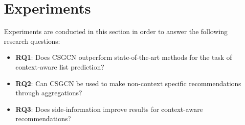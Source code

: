 \section{Experiments}\label{sec:experiments}
Experiments are conducted in this section in order to answer the following research questions:
\begin{itemize}
    \item \textbf{RQ1}: Does CSGCN outperform state-of-the-art methods for the task of context-aware list prediction?
    \item \textbf{RQ2}: Can CSGCN be used to make non-context specific recommendations through aggregations?
    \item \textbf{RQ3}: Does side-information improve results for context-aware recommendations?
\end{itemize}

